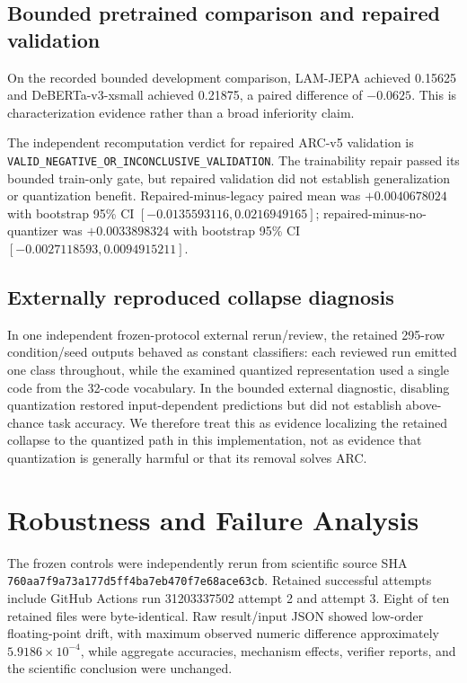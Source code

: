 \documentclass{article}
\begin{document}
\subsection{Bounded pretrained comparison and repaired validation}
On the recorded bounded development comparison, LAM-JEPA achieved 0.15625 and DeBERTa-v3-xsmall achieved 0.21875, a paired difference of $-0.0625$. This is characterization evidence rather than a broad inferiority claim.

The independent recomputation verdict for repaired ARC-v5 validation is \texttt{VALID\_NEGATIVE\_OR\_INCONCLUSIVE\_VALIDATION}. The trainability repair passed its bounded train-only gate, but repaired validation did not establish generalization or quantization benefit. Repaired-minus-legacy paired mean was $+0.0040678024$ with bootstrap 95\% CI $[-0.0135593116,0.0216949165]$; repaired-minus-no-quantizer was $+0.0033898324$ with bootstrap 95\% CI $[-0.0027118593,0.0094915211]$.

\subsection{Externally reproduced collapse diagnosis}
In one independent frozen-protocol external rerun/review, the retained 295-row condition/seed outputs behaved as constant classifiers: each reviewed run emitted one class throughout, while the examined quantized representation used a single code from the 32-code vocabulary. In the bounded external diagnostic, disabling quantization restored input-dependent predictions but did not establish above-chance task accuracy. We therefore treat this as evidence localizing the retained collapse to the quantized path in this implementation, not as evidence that quantization is generally harmful or that its removal solves ARC.

\section{Robustness and Failure Analysis}
The frozen controls were independently rerun from scientific source SHA \texttt{760aa7f9a73a177d5ff4ba7eb470f7e68ace63cb}. Retained successful attempts include GitHub Actions run 31203337502 attempt 2 and attempt 3. Eight of ten retained files were byte-identical. Raw result/input JSON showed low-order floating-point drift, with maximum observed numeric difference approximately $5.9186\times10^{-4}$, while aggregate accuracies, mechanism effects, verifier reports, and the scientific conclusion were unchanged.
\end{document}
